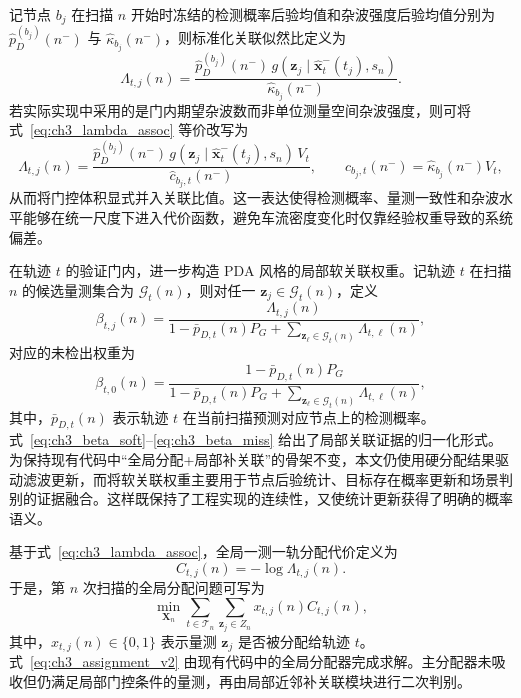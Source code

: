 \documentclass{xdupgthesis}
\begin{document}
记节点 $b_j$ 在扫描 $n$ 开始时冻结的检测概率后验均值和杂波强度后验均值分别为 $\hat p_D^{(b_j)}(n^-)$ 与 $\hat \kappa_{b_j}(n^-)$，则标准化关联似然比定义为
\begin{equation}
	\Lambda_{t,j}(n)
	=
	\frac{\hat p_D^{(b_j)}(n^-)\,g(\mathbf z_j\mid \hat{\mathbf x}^-_t(t_j),s_n)}{\hat \kappa_{b_j}(n^-)}.
	\label{eq:ch3_lambda_assoc}
\end{equation}
若实际实现中采用的是门内期望杂波数而非单位测量空间杂波强度，则可将式~\eqref{eq:ch3_lambda_assoc} 等价改写为
\begin{equation}
	\Lambda_{t,j}(n)
	=
	\frac{\hat p_D^{(b_j)}(n^-)\,g(\mathbf z_j\mid \hat{\mathbf x}^-_t(t_j),s_n)\,V_t}{\hat c_{b_j,t}(n^-)},
	\qquad
	\hat c_{b_j,t}(n^-)=\hat \kappa_{b_j}(n^-)V_t,
	\label{eq:ch3_lambda_assoc_gate}
\end{equation}
从而将门控体积显式并入关联比值。这一表达使得检测概率、量测一致性和杂波水平能够在统一尺度下进入代价函数，避免车流密度变化时仅靠经验权重导致的系统偏差。

在轨迹 $t$ 的验证门内，进一步构造 PDA 风格的局部软关联权重。记轨迹 $t$ 在扫描 $n$ 的候选量测集合为 $\mathcal G_t(n)$，则对任一 $\mathbf z_j\in\mathcal G_t(n)$，定义
\begin{equation}
	\beta_{t,j}(n)
	=
	\frac{\Lambda_{t,j}(n)}{1-\bar p_{D,t}(n)P_G+\sum_{\mathbf z_\ell\in \mathcal G_t(n)}\Lambda_{t,\ell}(n)},
	\label{eq:ch3_beta_soft}
\end{equation}
对应的未检出权重为
\begin{equation}
	\beta_{t,0}(n)
	=
	\frac{1-\bar p_{D,t}(n)P_G}{1-\bar p_{D,t}(n)P_G+\sum_{\mathbf z_\ell\in \mathcal G_t(n)}\Lambda_{t,\ell}(n)},
	\label{eq:ch3_beta_miss}
\end{equation}
其中，$\bar p_{D,t}(n)$ 表示轨迹 $t$ 在当前扫描预测对应节点上的检测概率。式~\eqref{eq:ch3_beta_soft}--\eqref{eq:ch3_beta_miss} 给出了局部关联证据的归一化形式。为保持现有代码中“全局分配+局部补关联”的骨架不变，本文仍使用硬分配结果驱动滤波更新，而将软关联权重主要用于节点后验统计、目标存在概率更新和场景判别的证据融合。这样既保持了工程实现的连续性，又使统计更新获得了明确的概率语义。

基于式~\eqref{eq:ch3_lambda_assoc}，全局一测一轨分配代价定义为
\begin{equation}
	C_{t,j}(n)=-\log \Lambda_{t,j}(n).
	\label{eq:ch3_cost_v2}
\end{equation}
于是，第 $n$ 次扫描的全局分配问题可写为
\begin{equation}
	\min_{\mathbf X_n}
	\sum_{t\in\mathcal T_n}\sum_{\mathbf z_j\in Z_n}
	x_{t,j}(n)C_{t,j}(n),
	\label{eq:ch3_assignment_v2}
\end{equation}
其中，$x_{t,j}(n)\in\{0,1\}$ 表示量测 $\mathbf z_j$ 是否被分配给轨迹 $t$。式~\eqref{eq:ch3_assignment_v2} 由现有代码中的全局分配器完成求解。主分配器未吸收但仍满足局部门控条件的量测，再由局部近邻补关联模块进行二次判别。
\end{document}
